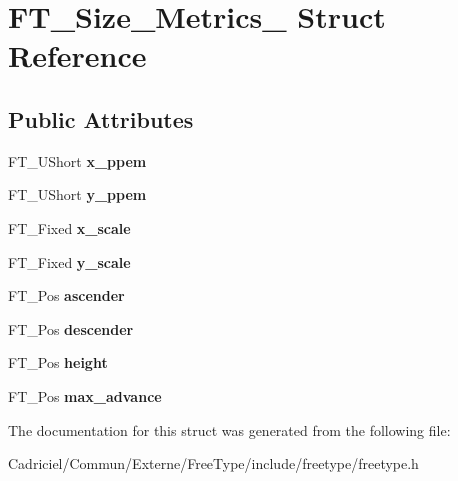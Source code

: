 \hypertarget{struct_f_t___size___metrics__}{}\section{F\+T\+\_\+\+Size\+\_\+\+Metrics\+\_\+ Struct Reference}
\label{struct_f_t___size___metrics__}
\subsection*{Public Attributes}
\begin{DoxyCompactItemize}
\item 
F\+T\+\_\+\+U\+Short {\bfseries x\+\_\+ppem}\hypertarget{struct_f_t___size___metrics___abb42b175a3450e9d8b84483f166d6c8a}{}\label{struct_f_t___size___metrics___abb42b175a3450e9d8b84483f166d6c8a}

\item 
F\+T\+\_\+\+U\+Short {\bfseries y\+\_\+ppem}\hypertarget{struct_f_t___size___metrics___abcdb70cb9e39a74679bc39c07f3275f7}{}\label{struct_f_t___size___metrics___abcdb70cb9e39a74679bc39c07f3275f7}

\item 
F\+T\+\_\+\+Fixed {\bfseries x\+\_\+scale}\hypertarget{struct_f_t___size___metrics___a5e92028bb9881e107a6fb75d557eaff1}{}\label{struct_f_t___size___metrics___a5e92028bb9881e107a6fb75d557eaff1}

\item 
F\+T\+\_\+\+Fixed {\bfseries y\+\_\+scale}\hypertarget{struct_f_t___size___metrics___a1f8b1cb3538b9920127f721dd061379d}{}\label{struct_f_t___size___metrics___a1f8b1cb3538b9920127f721dd061379d}

\item 
F\+T\+\_\+\+Pos {\bfseries ascender}\hypertarget{struct_f_t___size___metrics___ab5fde60a2661d7b774f61c264a2a6070}{}\label{struct_f_t___size___metrics___ab5fde60a2661d7b774f61c264a2a6070}

\item 
F\+T\+\_\+\+Pos {\bfseries descender}\hypertarget{struct_f_t___size___metrics___a9b2ca3a4391803e8721ed99eb9953d52}{}\label{struct_f_t___size___metrics___a9b2ca3a4391803e8721ed99eb9953d52}

\item 
F\+T\+\_\+\+Pos {\bfseries height}\hypertarget{struct_f_t___size___metrics___ae3361e264fb8a9e669f118bdb244439b}{}\label{struct_f_t___size___metrics___ae3361e264fb8a9e669f118bdb244439b}

\item 
F\+T\+\_\+\+Pos {\bfseries max\+\_\+advance}\hypertarget{struct_f_t___size___metrics___ac315a7a834ac1a57c7169ce021718958}{}\label{struct_f_t___size___metrics___ac315a7a834ac1a57c7169ce021718958}

\end{DoxyCompactItemize}


The documentation for this struct was generated from the following file\+:\begin{DoxyCompactItemize}
\item 
Cadriciel/\+Commun/\+Externe/\+Free\+Type/include/freetype/freetype.\+h\end{DoxyCompactItemize}
